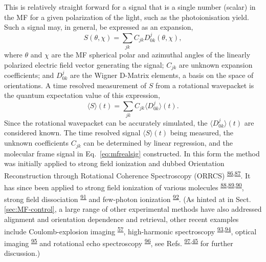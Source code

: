 \documentclass[10pt]{article}
\begin{document}
This is relatively straight forward for a signal that is a single number (scalar) in the MF for a given polarization of the light, such as the photoionisation yield. Such a signal may, in general, be expressed as an expansion,
\begin{equation}
S(\theta,\chi)=\sum_{jk}C_{jk}D^{j}_{0k}(\theta,\chi),
\label{eq:mfrealsig}
\end{equation}
where $\theta$ and $\chi$ are the MF spherical polar and azimuthal angles of the linearly polarized electric field vector generating the signal; $C_{jk}$ are unknown expansion coefficients; and $D^{j}_{0k}$ are the Wigner D-Matrix elements, a basis on the space of orientations. A time resolved measurement of $S$ from a rotational wavepacket is the quantum expectation value of this expression,
\begin{equation}
\langle S \rangle(t) = \sum_{jk}C_{jk}\langle D^{j}_{0k} \rangle (t).
\label{eq:St-Cjk}
\end{equation}
Since the rotational wavepacket can be accurately simulated, the $\langle D^{j}_{0k} \rangle (t)$ are considered known. The time resolved signal $\langle S \rangle(t)$ being measured, the unknown coefficients $C_{jk}$ can be determined by linear regression, and the molecular frame signal in Eq.~\ref{eq:mfrealsig} constructed. In this form the method was initially applied to strong field ionization and dubbed Orientation Reconstruction through Rotational Coherence Spectroscopy (ORRCS) \textsuperscript{\hyperref[csl:86]{86},\hyperref[csl:87]{87}}.
It has since been applied to strong field ionization of various molecules \textsuperscript{\hyperref[csl:88]{88},\hyperref[csl:89]{89},\hyperref[csl:90]{90}},
strong field dissociation \textsuperscript{\hyperref[csl:91]{91}} 
and few-photon ionization \textsuperscript{\hyperref[csl:92]{92}}. 
(As hinted at in Sect. \ref{sec:MF-control}, a large range of other experimental methods have also addressed alignment and orientation dependence and retrieval, other recent examples include Coulomb-explosion imaging \textsuperscript{\hyperref[csl:57]{57}}, high-harmonic spectroscopy \textsuperscript{\hyperref[csl:93]{93},\hyperref[csl:94]{94}}, optical imaging \textsuperscript{\hyperref[csl:95]{95}} and rotational echo spectroscopy \textsuperscript{\hyperref[csl:96]{96}}, see Refs. \textsuperscript{\hyperref[csl:97]{97},\hyperref[csl:45]{45}} for further discussion.)
\end{document}
